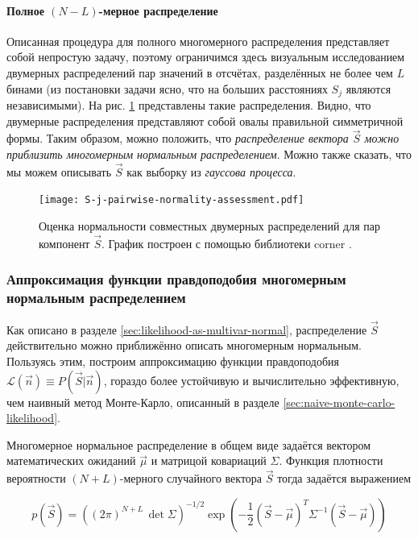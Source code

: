 \documentclass[12pt]{book}
\begin{document}
	\paragraph{Полное $(N-L)$-мерное распределение}
	Описанная процедура для полного многомерного распределения представляет собой непростую задачу, поэтому ограничимся здесь визуальным исследованием двумерных распределений пар значений в отсчётах, разделённых не более чем $L$ бинами (из постановки задачи ясно, что на больших расстояниях $S_j$ являются независимыми). На рис. \ref{pic:s-j-pairwise-norm-assess} представлены такие распределения. Видно, что двумерные распределения представляют собой овалы правильной симметричной формы. Таким образом, можно положить, что \textit{распределение вектора $\vec{S}$ можно приблизить многомерным нормальным распределением}. Можно также сказать, что мы можем описывать $\vec{S}$ как выборку из \textit{гауссова процесса}.

	\begin{figure}[H]
		\centering
		\texttt{[image: S-j-pairwise-normality-assessment.pdf]}
		\caption{Оценка нормальности совместных двумерных распределений для пар компонент $\vec{S}$. График построен с помощью библиотеки corner \cite{ForemanMackey2016}.}
		\label{pic:s-j-pairwise-norm-assess}
	\end{figure}

	\subsubsection{Аппроксимация функции правдоподобия многомерным нормальным распределением}
	
	Как описано в разделе \ref{sec:likelihood-as-multivar-normal}, распределение $\vec{S}$ действительно можно приближённо описать многомерным нормальным. Пользуясь этим, построим аппроксимацию функции правдоподобия $\mathcal{L}(\vec{n}) \equiv P(\vec{S} | \vec{n})$, гораздо более устойчивую и вычислительно эффективную, чем наивный метод Монте-Карло, описанный в разделе \ref{sec:naive-monte-carlo-likelihood}.

	Многомерное нормальное распределение в общем виде задаётся вектором математических ожиданий $\vec{\mu}$ и матрицой ковариаций $\Sigma$. Функция плотности вероятности $(N+L)$-мерного случайного вектора $\vec{S}$ тогда задаётся выражением
	
	\begin{equation}
		p(\vec{S}) = \left( (2 \pi)^{N+L} \, \det \Sigma \right)^{-1/2} \exp \left( - \frac{1}{2} (\vec{S} - \vec{\mu})^T \Sigma^{-1} (\vec{S} - \vec{\mu}) \right)
	\end{equation}
\end{document}

